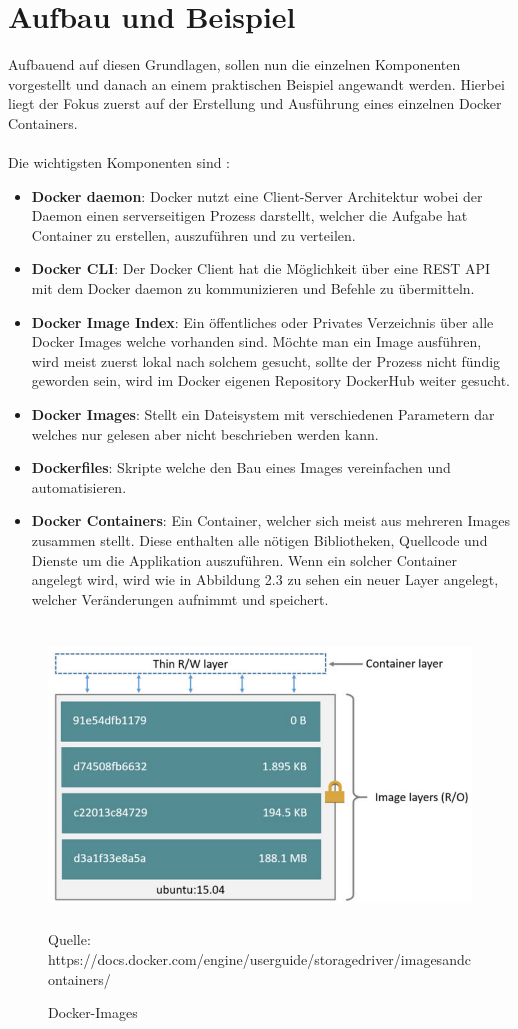 \documentclass[12pt,toc=bib,toc=listof]{scrreprt}
\begin{document}
\section{Aufbau und Beispiel}

Aufbauend auf diesen Grundlagen, sollen nun die einzelnen Komponenten vorgestellt und danach an einem praktischen Beispiel angewandt werden.
Hierbei liegt der Fokus zuerst auf der Erstellung und Ausführung eines einzelnen Docker Containers.\\
\\
Die wichtigsten Komponenten sind :
\begin{itemize}
	\item \textbf{Docker daemon}: Docker nutzt eine Client-Server Architektur wobei der Daemon einen serverseitigen Prozess darstellt, welcher die Aufgabe hat Container zu erstellen, auszuführen und zu verteilen.
	\item \textbf{Docker CLI}: Der Docker Client hat die Möglichkeit über eine REST API mit dem Docker daemon zu kommunizieren und Befehle zu übermitteln.
	\item \textbf{Docker Image Index}: Ein öffentliches oder Privates Verzeichnis über alle Docker Images welche vorhanden sind. Möchte man ein Image ausführen, wird meist zuerst lokal nach solchem gesucht, sollte der Prozess nicht fündig geworden sein, wird im Docker eigenen Repository DockerHub weiter gesucht.
	\item \textbf{Docker Images}: Stellt ein Dateisystem mit verschiedenen Parametern dar welches nur gelesen aber nicht beschrieben werden kann.
	\item \textbf{Dockerfiles}: Skripte welche den Bau eines Images vereinfachen und automatisieren.
	\item \textbf{Docker Containers}: Ein Container, welcher sich meist aus mehreren Images zusammen stellt. Diese enthalten alle nötigen Bibliotheken, Quellcode und Dienste um die Applikation auszuführen. Wenn ein solcher Container angelegt wird, wird wie in Abbildung 2.3 zu sehen ein neuer Layer angelegt, welcher Veränderungen aufnimmt und speichert.
\end{itemize}
\begin{figure}
	\centering
	\caption{Docker-Images}
	\includegraphics[width=15cm, height=8cm, scale=0.3]{container-images.png}
	Quelle: https://docs.docker.com/engine/userguide/storagedriver/imagesandcontainers/
\end{figure}
\end{document}
